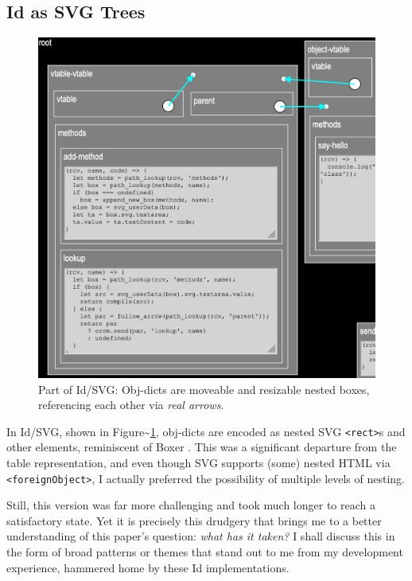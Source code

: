 \hypertarget{id-as-svg-trees}{%
\subsection{Id as SVG Trees}\label{id-as-svg-trees}}

\begin{figure}
  \centering
  \includegraphics[width=\linewidth]{orom-svg.png}
  \caption{Part of Id{}/SVG: Obj-dicts are moveable and resizable nested boxes,
           referencing each other via \emph{real arrows}.\label{fig:orom-svg}}
\end{figure}

In Id{}/SVG, shown in Figure\textasciitilde{}\ref{fig:orom-svg},
obj-dicts are encoded as nested SVG
\texttt{\textless{}rect\textgreater{}}s and other elements, reminiscent
of Boxer \cite{boxer}. This was a significant departure from the table
representation, and even though SVG supports (some) nested HTML via
\texttt{\textless{}foreignObject\textgreater{}}, I actually preferred
the possibility of multiple levels of nesting.

Still, this version was far more challenging and took much longer to
reach a satisfactory state. Yet it is precisely this drudgery that
brings me to a better understanding of this paper's question: \emph{what
has it taken?} I shall discuss this in the form of broad patterns or
themes that stand out to me from my development experience, hammered
home by these Id{} implementations.

